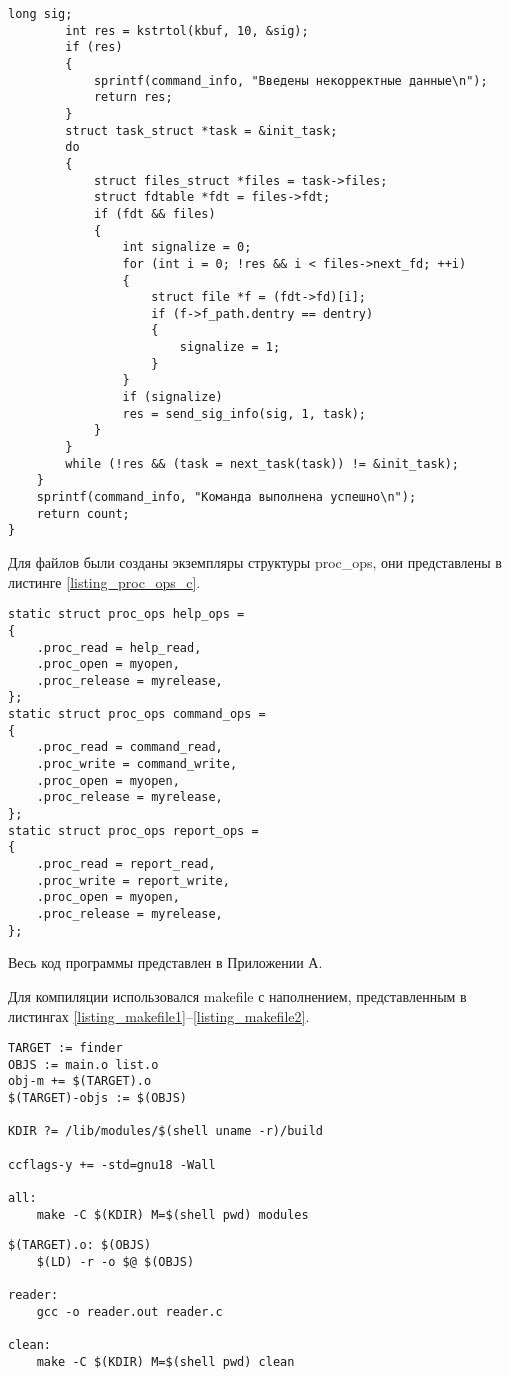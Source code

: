 \begin{center}
	\begin{lstlisting}[label=listing_report_write2,caption=Функция записи в файл report]		
		long sig;
		int res = kstrtol(kbuf, 10, &sig);
		if (res)
		{
			sprintf(command_info, "Введены некорректные данные\n");
			return res;
		}
		struct task_struct *task = &init_task;
		do
		{
			struct files_struct *files = task->files;
			struct fdtable *fdt = files->fdt;
			if (fdt && files)
			{
				int signalize = 0;
				for (int i = 0; !res && i < files->next_fd; ++i)
				{
					struct file *f = (fdt->fd)[i];
					if (f->f_path.dentry == dentry)
					{
						signalize = 1;
					}
				}
				if (signalize)
				res = send_sig_info(sig, 1, task);
			}
		}
		while (!res && (task = next_task(task)) != &init_task);
	}
	sprintf(command_info, "Команда выполнена успешно\n");
	return count;
}
	\end{lstlisting}
\end{center}

Для файлов были созданы экземпляры структуры proc\_ops, они представлены в листинге \ref{listing_proc_ops_c}.

\pagebreak

\begin{center}
	\begin{lstlisting}[label=listing_proc_ops_c,caption=Экземпляры структуры proc\_ops]		
static struct proc_ops help_ops = 
{
	.proc_read = help_read,
	.proc_open = myopen,
	.proc_release = myrelease,
};
static struct proc_ops command_ops = 
{
	.proc_read = command_read,
	.proc_write = command_write,
	.proc_open = myopen,
	.proc_release = myrelease,
};
static struct proc_ops report_ops = 
{
	.proc_read = report_read,
	.proc_write = report_write,
	.proc_open = myopen,
	.proc_release = myrelease,
};
\end{lstlisting}
\end{center}

Весь код программы представлен в Приложении А.

Для компиляции использовался makefile с наполнением, представленным в листингах \ref{listing_makefile1}--\ref{listing_makefile2}.
\begin{center}
	\begin{lstlisting}[label=listing_makefile1,caption=Makefile проекта]		
TARGET := finder
OBJS := main.o list.o
obj-m += $(TARGET).o
$(TARGET)-objs := $(OBJS)

KDIR ?= /lib/modules/$(shell uname -r)/build

ccflags-y += -std=gnu18 -Wall

all:
	make -C $(KDIR) M=$(shell pwd) modules
	\end{lstlisting}
\end{center}

\begin{center}
	\begin{lstlisting}[label=listing_makefile2,caption=Makefile проекта]		
$(TARGET).o: $(OBJS)
	$(LD) -r -o $@ $(OBJS)

reader:
	gcc -o reader.out reader.c

clean:
	make -C $(KDIR) M=$(shell pwd) clean
	\end{lstlisting}
\end{center}

